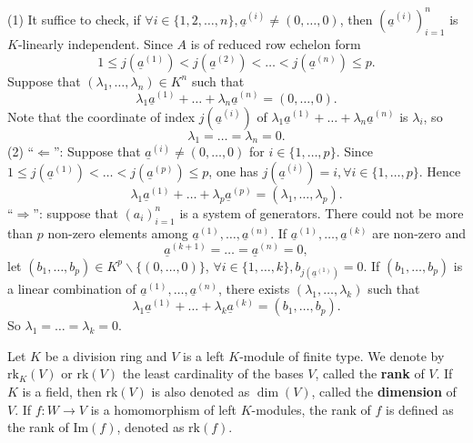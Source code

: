 \begin{proofenv}
    \quad
    \newline
    (1) It suffice to check, if $\forall i\in \{1,2,\dots,n\},\underline{a}^{(i)}\not=(0,\dots,0)$, then $\left(\underline{a}^{(i)}\right)_{i=1}^n$ is $K$-linearly independent.
    Since $A$ is of reduced row echelon form 
    $$1\le j(\underline{a}^{(1)})<j(\underline{a}^{(2)})<\dots<j(\underline{a}^{(n)})\le p.$$
    Suppose that $(\lambda_1,\dots,\lambda_n)\in K^n$ such that 
    $$\lambda_1 \underline{a}^{(1)}+\dots+\lambda_n\underline{a}^{(n)}=(0,\dots,0).$$
    Note that the coordinate of index $j(\underline{a}^{(i)})$ of $\lambda_1 \underline{a}^{(1)}+\dots+\lambda_n\underline{a}^{(n)}$ is $\lambda_i$, so $$\lambda_1=\dots=\lambda_n=0.$$
    (2) ``$\Leftarrow$'': Suppose that $\underline{a}^{(i)}\not=(0,\dots,0)$ for $i\in \{1,\dots,p\}$. Since $1\le j(\underline{a}^{(1)})<\dots< j(\underline{a}^{(p)})\le p$, one has $j(\underline{a}^{(i)})=i, \forall i\in \{1,\dots,p\}$. Hence $$\lambda_1\underline{a}^{(1)}+\dots+\lambda_p\underline{a}^{(p)}=(\lambda_1,\dots,\lambda_p).$$
    ``$\Rightarrow$'': suppose that $(a_i)_{i=1}^n$ is a system of generators. There could not be more than $p$ non-zero elements among $\underline{a}^{(1)},\dots,\underline{a}^{(n)}$. If $\underline{a}^{(1)},\dots,\underline{a}^{(k)}$ are non-zero and 
    $$\underline{a}^{(k+1)}=\dots=\underline{a}^{(n)}=0,$$
    let $(b_1,\dots,b_p)\in K^p\backslash\{(0,\dots,0)\}$, $\forall i\in \{1,\dots,k\}, b_{j(\underline{a}^{(1)})}=0$. If $(b_1,\dots,b_p)$ is a linear combination of $\underline{a}^{(1)},\dots,\underline{a}^{(n)}$, there exists $(\lambda_1,\dots,\lambda_k)$ such that 
    $$\lambda_1\underline{a}^{(1)}+\dots+\lambda_k\underline{a}^{(k)}=(b_1,\dots,b_p).$$
    So $\lambda_1=\dots=\lambda_k=0$.
\end{proofenv}

\begin{definitionenv}
    Let $K$ be a division ring and $V$ is a left $K$-module of finite type. We denote by $\mathrm{rk}_K(V)$ or $\mathrm{rk}(V)$ the least cardinality of the bases $V$, called the \textbf{rank} of $V$. If $K$ is a field, then $\mathrm{rk}(V)$ is also denoted as $\dim(V)$, called the \textbf{dimension} of $V$. If $f:W\longrightarrow V$ is a homomorphism of left $K$-modules, the rank of $f$ is defined as the rank of $\mathrm{Im}(f)$, denoted as $\mathrm{rk}(f)$.
\end{definitionenv}







